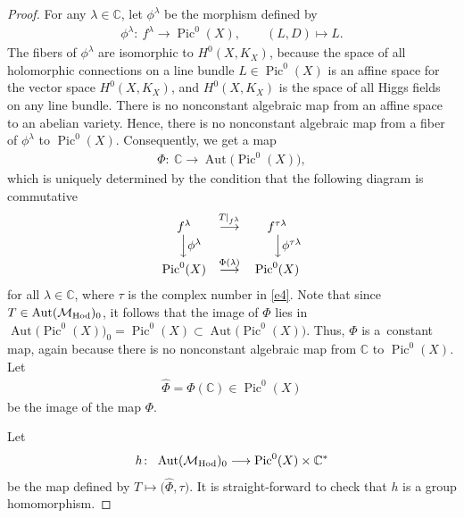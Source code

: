 \begin{proof}
For any $\lambda \in \mathbb C$, let $\phi^\lambda$ be the morphism def\/ined by
\begin{gather}\label{e7}
\phi^\lambda \colon \ f^\lambda \longrightarrow \operatorname{Pic}^0(X) ,\qquad (L, D) \longmapsto L .
\end{gather}
The f\/ibers of $\phi^\lambda$ are isomorphic to $H^0(X, K_X)$, because the space of all holomorphic connections on a line bundle $L \in \operatorname{Pic}^0(X)$ is an af\/f\/ine space for the vector space $H^0(X, K_X)$, and $H^0(X, K_X)$ is the space of all Higgs f\/ields on any line bundle. There is no nonconstant algebraic map from an af\/f\/ine space to an abelian variety. Hence, there is no nonconstant algebraic map from a f\/iber of $\phi^\lambda$ to $\operatorname{Pic}^0(X)$. Consequently, we get a map
\begin{gather*}
\Phi \colon \  {\mathbb C} \longrightarrow \operatorname{Aut}\big(\operatorname{Pic}^0(X)\big),
\end{gather*}
which is uniquely determined by the condition that the following diagram is commutative
\begin{gather*}
\begin{matrix}
f^\lambda & \stackrel{T\vert_{f^\lambda}}{\longrightarrow} & f^{\tau\lambda}\\
~ ~~ \Big\downarrow \phi^\lambda && ~ ~~~~ \Big\downarrow \phi^{\tau\lambda}\\
\operatorname{Pic}^0(X) & \stackrel{\Phi(\lambda)}{\longrightarrow} &\operatorname{Pic}^0(X)
\end{matrix}
\end{gather*}
for all $\lambda \in \mathbb C$, where $\tau$ is the complex number in \eqref{e4}$ $. Note that since $T \in \operatorname{Aut}({\mathcal M}_{\rm Hod})_0$, it follows that the image of $\Phi$ lies in $\operatorname{Aut}\big(\operatorname{Pic}^0(X)\big)_0 = \operatorname{Pic}^0(X) \subset \operatorname{Aut}\big(\operatorname{Pic}^0(X)\big)$. Thus, $\Phi$ is a~constant map, again because there is no nonconstant algebraic map from $\mathbb C$ to $\operatorname{Pic}^0(X)$. Let{\samepage
\begin{gather}\label{e5}
\widehat{\Phi} = \Phi({\mathbb C}) \in \operatorname{Pic}^0(X)
\end{gather}
be the image of the map $\Phi$.}

Let
\begin{gather*}
h \colon \ \operatorname{Aut}({\mathcal M}_{\rm Hod})_0 \longrightarrow \operatorname{Pic}^0(X)\times {\mathbb C}^*
\end{gather*}
be the map def\/ined by $T \longmapsto \big(\widehat{\Phi}, \tau\big)$. It is straight-forward to check that $h$ is a group homomorphism.


\end{proof}
